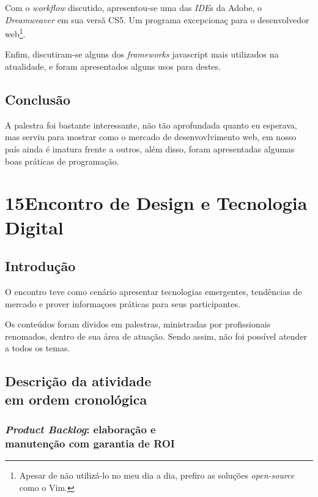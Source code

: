\documentclass[a4paper]{report}
\begin{document}
        Com o \emph{workflow} discutido, apresentou-se uma das \emph{IDE}s da
        Adobe, o \emph{Dreamweaver} em sua vers\~{a} CS5. Um programa excepcionaç
        para o desenvolvedor web\footnote{Apesar de n\~{a}o utiliz\'{a}-lo no meu
        dia a dia, prefiro as solu\c{c}\~{o}es \emph{open-source} como o Vim.}.

        Enfim, discutiram-se alguns dos \emph{frameworks} javascript mais
        utilizados na atualidade, e foram apresentados alguns usos para destes.

        \section{Conclus\~{a}o}

        A palestra foi bastante interessante, n\~{a}o t\~{a}o aprofundada quanto
        eu esperava, mas serviu para mostrar como o mercado de desenvovlvimento
        web, em nosso pa\'{i}s ainda \'{e} imatura frente a outros, al\'{e}m
        disso, foram apresentadas algumas boas pr\'{a}ticas de programa\c{c}\~{a}o.

    \chapter[15\textordmasculine EDTED]{15\textordmasculine Encontro de Design e
    Tecnologia Digital}

        \section{Introdu\c{c}\~{a}o}
        O encontro teve como cen\'{a}rio apresentar tecnologias emergentes,
        tend\^{e}ncias de mercado e prover informa\c{c}oes pr\'{a}ticas para
        seus participantes.

        Os conte\'{u}dos foram dividos em palestras, ministradas por profissionais
        renomados, dentro de sua \'{a}rea de atua\c{c}\~{a}o. Sendo assim, n\~{a}o
        foi poss\'{i}vel atender a todos os temas.

        \section[Descri\c{c}\~{a}o atividade]{Descri\c{c}\~{a}o da atividade
        \\em ordem cronol\'{o}gica}
        
            \subsection[\emph{Product Backlog}]{\emph{Product Backlog}: elabora\c{c}\~{a}o e
            \\manuten\c{c}\~{a}o com garantia de ROI}
\end{document}
